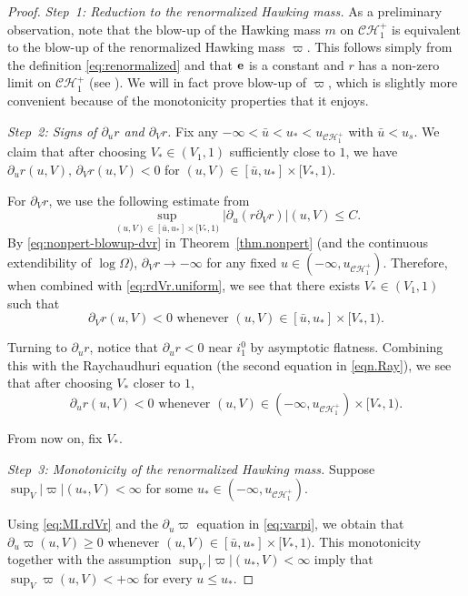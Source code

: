 \documentclass[10pt, reqno]{amsart}
\theoremstyle{definition}
\theoremstyle{remark}
\numberwithin{equation}{section}
\newcommand{\rd}{\partial}
\newcommand{\0}{\emptyset}
\newcommand{\Omg}{\Omega}
\newcommand{\calC}{\mathcal C}
\newcommand{\calH}{\mathcal H}
\newcommand{\CH}{\calC \calH^{+}}		%
\newcommand{\pfstep}[1]{\vspace{.5em} {\it #1.}}
\begin{document}
\begin{proof}
\pfstep{Step~1: Reduction to the renormalized Hawking mass} As a preliminary observation, note that the blow-up of the Hawking mass $m$ on $\CH_1$ is equivalent to the blow-up of the renormalized Hawking mass $\varpi$. This follows simply from the definition \eqref{eq:renormalized} and that $\bf e$ is a constant and $r$ has a non-zero limit on $\CH_1$ (see \cite[part (2)(e) of Theorem~4.1]{LO.interior}). We will in fact prove blow-up of $\varpi$, which is slightly more convenient because of the monotonicity properties that it enjoys.

\pfstep{Step~2: Signs of $\rd_u r$ and $\rd_V r$} Fix any $-\infty< \bar{u} < u_* < u_{\CH_1}$ with $\bar{u} < u_s$. We claim that after choosing $V_* \in (V_1, 1)$ sufficiently close to $1$, we have $\rd_u r(u,V), \, \rd_V r(u,V) < 0$ for $(u,V) \in [\bar{u}, u_*] \times [V_*, 1)$.

For $\rd_V r$, we use the following estimate from \cite[equation (10.13)]{LO.interior} 
\begin{equation}\label{eq:rdVr.uniform}
\sup_{(u, V) \in [\bar{u},u_*] \times [V_{\ast}, 1)} \Big| \rd_u (r \rd_V r) \Big|(u,V) \leq C.
\end{equation}
By \eqref{eq:nonpert-blowup-dvr} in Theorem~\ref{thm.nonpert} (and the continuous extendibility of $\log\Omg$), $\rd_V r\to -\infty$ for any fixed $u \in (-\infty,u_{\CH_1})$. Therefore, when combined with \eqref{eq:rdVr.uniform}, we see that there exists $V_* \in (V_1,1)$ such that 
\begin{equation}\label{eq:MI.rdVr}
\rd_V r(u,V)<0 \mbox{ whenever $(u,V) \in [\bar{u}, u_*] \times [V_*, 1)$}.
\end{equation}

Turning to $\rd_u r$, notice that $\rd_u r<0$ near $i^0_1$ by asymptotic flatness. Combining this with the Raychaudhuri equation (the second equation in \eqref{eqn.Ray}), we see that after choosing $V_*$ closer to $1$, 
\begin{equation}\label{eq:MI.rdur}
\rd_u r(u,V)<0 \mbox{ whenever $(u,V) \in (-\infty, u_{\CH_1}) \times [V_*, 1)$}.
\end{equation}

From now on, fix $V_*$.


\pfstep{Step~3: Monotonicity of the renormalized Hawking mass} Suppose $\sup_{V}|\varpi|(u_*,V) <\infty$ for some $u_* \in (-\infty,u_{\CH_{1}})$.
 
Using \eqref{eq:MI.rdVr} and the $\rd_u \varpi$ equation in \eqref{eq:varpi}, we obtain that $\rd_u\varpi(u,V)\geq 0$ whenever $(u,V) \in [\bar{u}, u_*] \times [V_*, 1)$. This monotonicity together with the assumption $\sup_{V}|\varpi|(u_*,V) <\infty$ imply that $\sup_{V}\varpi(u,V) <+ \infty$ for every $u \leq u_*$. 


\end{proof}
\end{document}
